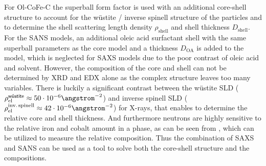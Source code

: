\documentclass[\main/dresen_thesis.tex]{subfiles}
\begin{document}
    For Ol-CoFe-C the superball form factor is used with an additional core-shell structure to account for the w\"ustite / inverse spinell structure of the particles and to determine the shell scattering length density $\rho_\mathrm{shell}$ and shell thickness $D_\mathrm{shell}$.
    For the SANS models, an additional oleic acid surfactant shell with the same superball parameters as the core model and a thickness $D_\mathrm{OA}$ is added to the model, which is neglected for SAXS models due to the poor contrast of oleic acid and solvent.
    However, the composition of the core and shell can not be determined by XRD and EDX alone as the complex structure leaves too many variables.
    There is luckily a significant contrast between the w\"ustite SLD ($\rho_\mathrm{el}^\textsf{w\"ustite} \approx 50 \cdot 10^{-6} \angstrom^{-2}$) and inverse spinell SLD ($\rho_\mathrm{el}^\mathrm{inv.\, spinell} \approx 42 \cdot 10^{-6} \angstrom^{-2}$) for X-rays, that enables to determine the relative core and shell thickness.
    And furthermore neutrons are highly sensitive to the relative iron and cobalt amount in a phase, as can be seen from , which can be utilized to measure the relative composition.
    Thus the combination of SAXS and SANS can be used as a tool to solve both the core-shell structure and the compositions.
\end{document}
